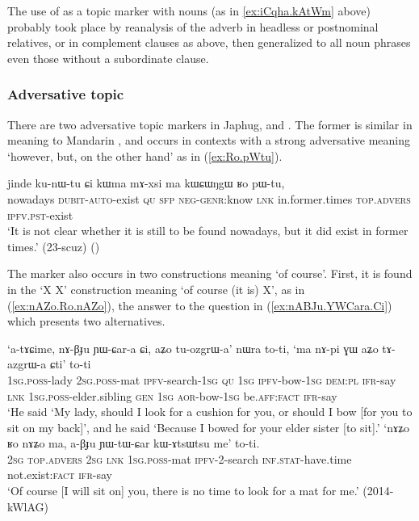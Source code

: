 The use of  as a topic marker with nouns (as in \ref{ex:iCqha.kAtWm} above) probably took place by reanalysis of the adverb in headless or postnominal relatives, or in complement clauses as above, then generalized to all noun phrases even those without a subordinate clause.

 \subsubsection{Adversative topic} \label{sec:adversative.topic}
There are two adversative topic markers in Japhug,  and . The former is similar in meaning to Mandarin , and occurs in contexts with a strong adversative meaning `however, but, on the other hand' as in (\ref{ex:Ro.pWtu}).

\begin{exe}
\ex \label{ex:Ro.pWtu}
\gll jinde ku-nɯ-tu ɕi kɯma mɤ-xsi ma kɯɕɯŋgɯ ʁo pɯ-tu, \\
nowadays \textsc{dubit}-\textsc{auto}-exist \textsc{qu} \textsc{sfp} \textsc{neg}-\textsc{genr}:know \textsc{lnk} in.former.times \textsc{top}.\textsc{advers} \textsc{ipfv}.\textsc{pst}-exist \\
\glt `It is not clear whether it is still to be found nowadays, but it did exist in former times.' (23-scuz)
()
\end{exe}

The marker  also occurs in two constructions meaning `of course'. First, it is found in the `X  X' construction meaning `of course (it is)  X', as in (\ref{ex:nAZo.Ro.nAZo}), the answer to the question in (\ref{ex:nABJu.YWCara.Ci}) which presents two alternatives.

\begin{exe}
\ex
\begin{xlist}
\ex  \label{ex:nABJu.YWCara.Ci}
\gll `a-tɤɕime, nɤ-βɟu ɲɯ-ɕar-a ɕi, aʑo tu-ozgrɯ-a' nɯra to-ti, `ma nɤ-pi ɣɯ aʑo tɤ-azgrɯ-a ɕti' to-ti  \\
\textsc{1sg}.\textsc{poss}-lady \textsc{2sg}.\textsc{poss}-mat \textsc{ipfv}-search-\textsc{1sg} \textsc{qu} \textsc{1sg} \textsc{ipfv}-bow-\textsc{1sg} \textsc{dem}:\textsc{pl} \textsc{ifr}-say \textsc{lnk} \textsc{1sg}.\textsc{poss}-elder.sibling \textsc{gen} \textsc{1sg} \textsc{aor}-bow-\textsc{1sg} be.\textsc{aff}:\textsc{fact} \textsc{ifr}-say \\
\glt `He said `My lady, should I look for a cushion for you, or should I bow [for you to sit on my back]', and he said  `Because I bowed for your elder sister [to sit].'
\ex  \label{ex:nAZo.Ro.nAZo}
\gll  `nɤʑo ʁo nɤʑo ma, a-βɟu ɲɯ-tɯ-ɕar kɯ-ɤtsɯtsu me' to-ti.   \\
\textsc{2sg} \textsc{top}.\textsc{advers} \textsc{2sg} \textsc{lnk} \textsc{1sg}.\textsc{poss}-mat \textsc{ipfv}-2-search \textsc{inf}.\textsc{stat}-have.time  not.exist:\textsc{fact} \textsc{ifr}-say \\
\glt  `Of course [I will sit on] you, there is no time to look for a mat for me.' (2014-kWlAG)
\end{xlist}
\end{exe}

